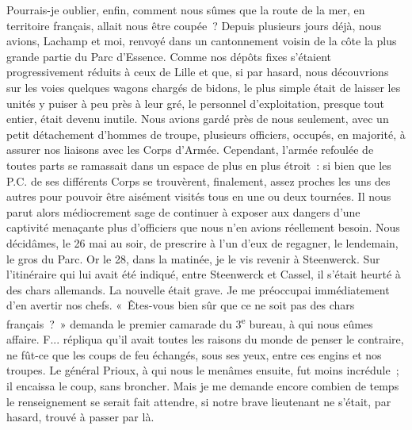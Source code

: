 \documentclass[french,twoside]{book} %
\begin{document}
Pourrais-je oublier, enfin, comment nous sûmes que la route de la mer, en territoire français, allait nous être coupée ? Depuis plusieurs jours déjà, nous avions, Lachamp et moi, renvoyé dans un cantonnement voisin de la côte la plus grande partie du Parc d’Essence. Comme nos dépôts fixes s’étaient progressivement réduits à ceux de Lille et que, si par hasard, nous découvrions sur les voies quelques wagons chargés de bidons, le plus simple était de laisser les unités y puiser à peu près à leur gré, le personnel d’exploitation, presque tout entier, était devenu inutile. Nous avions gardé près de nous seulement, avec un petit détachement d’hommes de troupe, plusieurs officiers, occupés, en majorité, à assurer nos liaisons avec les Corps d’Armée. Cependant, l’armée refoulée de toutes parts se ramassait dans un espace de plus en plus étroit : si bien que les P.C. de ses différents Corps se trouvèrent, finalement, assez proches les uns des autres pour pouvoir être aisément visités tous en une ou deux tournées. Il nous parut alors médiocrement sage de continuer à exposer aux dangers d’une captivité menaçante plus d’officiers que nous n’en avions réellement besoin. Nous décidâmes, le 26 mai au soir, de prescrire à l’un d’eux de regagner, le lendemain, le gros du Parc. Or le 28, dans la matinée, je le vis revenir à Steenwerck. Sur l’itinéraire qui lui avait été indiqué, entre Steenwerck et Cassel, il s’était heurté à des chars allemands. La nouvelle était grave. Je me préoccupai immédiatement d’en avertir nos chefs. « Êtes-vous bien sûr que ce ne soit pas des chars français ? » demanda le premier camarade du 3\textsuperscript{e} bureau, à qui   nous eûmes affaire. F... répliqua qu’il avait toutes les raisons du monde de penser le contraire, ne fût-ce que les coups de feu échangés, sous ses yeux, entre ces engins et nos troupes. Le général Prioux, à qui nous le menâmes ensuite, fut moins incrédule ; il encaissa le coup, sans broncher. Mais je me demande encore combien de temps le renseignement se serait fait attendre, si notre brave lieutenant ne s’était, par hasard, trouvé à passer par là.\par
\end{document}
